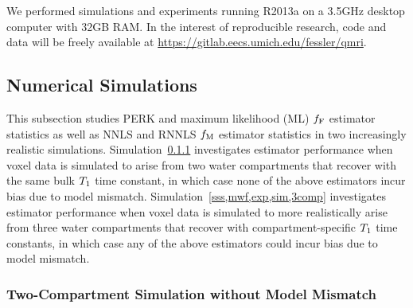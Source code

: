 We performed simulations and experiments
running \matlab R2013a 
on a 3.5GHz desktop computer with 32GB RAM.
In the interest of reproducible research,
code and data will be freely available
at \url{https://gitlab.eecs.umich.edu/fessler/qmri}.

\subsection{Numerical Simulations}
\label{ss,mwf,exp,sim}

This subsection studies
PERK and maximum likelihood (ML) $f_{\mathrm{F}}$ estimator statistics
as well as 
NNLS and RNNLS $f_\mathrm{M}$ estimator statistics 
in two increasingly realistic simulations.
Simulation~\ref{sss,mwf,exp,sim,2comp}
investigates estimator performance
when voxel data is simulated to arise 
from two water compartments
that recover with the same bulk $T_1$ time constant,
in which case none of the above estimators
incur bias due to model mismatch.
Simulation~\ref{sss,mwf,exp,sim,3comp}
investigates estimator performance
when voxel data is simulated 
to more realistically arise
from three water compartments
that recover with compartment-specific $T_1$ time constants,
in which case any of the above estimators
could incur bias due to model mismatch.

\subsubsection{Two-Compartment Simulation without Model Mismatch}
\label{sss,mwf,exp,sim,2comp}

